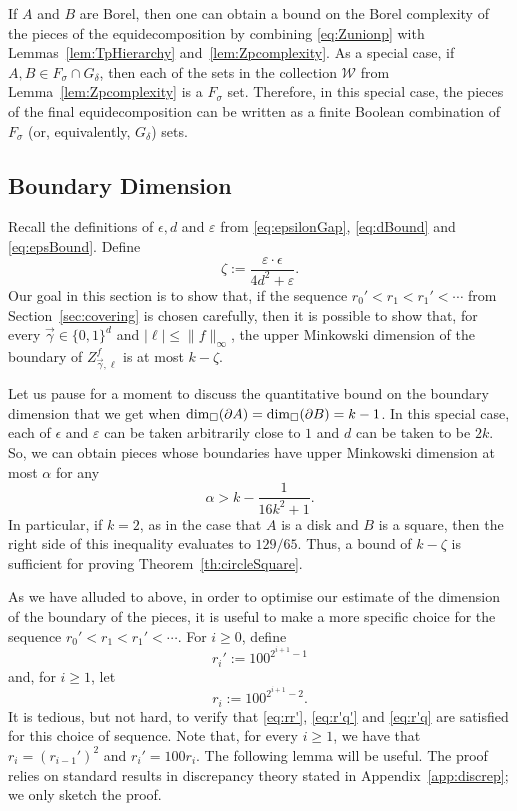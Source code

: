 \documentclass[12pt,a4paper]{amsart}
\numberwithin{equation}{section}
\theoremstyle{definition}
\begin{document}
If $A$ and $B$ are Borel, then one can obtain a bound on the Borel complexity of the pieces of the equidecomposition by combining \eqref{eq:Zunionp} with Lemmas~\ref{lem:TpHierarchy} and~\ref{lem:Zpcomplexity}. As a special case, if $A,B\in F_\sigma\cap G_\delta$, then each of the sets in the collection $\mathcal{W}$ from Lemma~\ref{lem:Zpcomplexity} is a $F_\sigma$ set. Therefore, in this special case, the pieces of the final equidecomposition can be written as a finite Boolean combination of $F_\sigma$ (or, equivalently, $G_\delta$) sets. 

\subsection{Boundary Dimension}

 Recall the definitions of $\epsilon,d$ and $\varepsilon$ from \eqref{eq:epsilonGap}, \eqref{eq:dBound} and \eqref{eq:epsBound}. Define
\begin{equation}
\label{eq:zeta}
\zeta:=\frac{\varepsilon\cdot \epsilon}{4d^2+\varepsilon}.
\end{equation}
Our goal in this section is to show that, if the sequence $r_0'<r_1<r_1'<\cdots$ from Section~\ref{sec:covering} is chosen carefully, then it is possible to show that, for every $\vec{\gamma}\in\{0,1\}^d$ and $|\ell|\leq \|f\|_\infty$, the upper Minkowski dimension of the boundary of $Z_{\vec{\gamma},\ell}^f$ is at most $k-\zeta$.

Let us pause for a moment to discuss the quantitative bound on the boundary dimension that we get when $\operatorname{dim}_\square(\partial A)=\operatorname{dim}_\square(\partial B)=k-1$. In this special case, each of $\epsilon$ and $\varepsilon$ can be taken arbitrarily close to $1$ and $d$ can be taken to be $2k$. So, we can obtain pieces whose boundaries have upper Minkowski dimension at most $\alpha$ for any
\[\alpha > k - \frac{1}{16k^2+1}.\]
In particular, if $k=2$, as in the case that $A$ is a disk and $B$ is a square, then the right side of this inequality evaluates to $129/65$. Thus, a bound of $k-\zeta$ is sufficient for proving Theorem~\ref{th:circleSquare}.

As we have alluded to above, in order to optimise our estimate of the dimension of the boundary of the pieces, it is useful to make a more specific choice for the sequence $r_0'<r_1<r_1'<\cdots$. For $i\geq0$, define
\begin{equation}\label{eq:ri'specific}r_{i}':=100^{2^{i+1} - 1}\end{equation}
and, for $i\geq 1$, let
\begin{equation}\label{eq:rispecific}r_i:=100^{2^{i+1} - 2}.\end{equation}
It is tedious, but not hard, to verify that \eqref{eq:rr'}, \eqref{eq:r'q'} and \eqref{eq:r'q} are satisfied for this choice of sequence. Note that, for every $i\geq1$, we have that $r_i=\left(r_{i-1}'\right)^2$ and $r_i'=100r_i$. The following lemma will be useful. The proof relies on standard results in discrepancy theory stated in Appendix~\ref{app:discrep}; we only sketch the proof.
\end{document}
